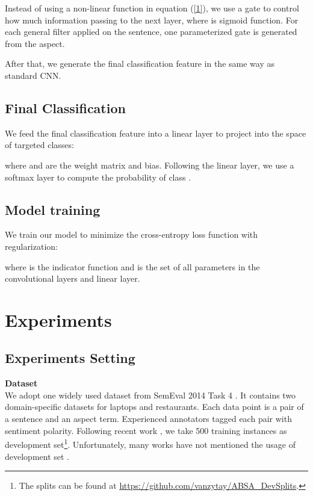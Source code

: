 \documentclass[11pt,a4paper]{article}
\begin{document}
Instead of using a non-linear function  in equation (\ref{1}), we use a gate  to control how much information passing to the next layer, where  is sigmoid function. For each general filter applied on the sentence, one parameterized gate is generated from the aspect.

After that, we generate the final classification feature  in the same way as standard CNN.


\subsection{Final Classification}
We feed the final classification feature into a linear layer to project  into the space of targeted classes:

where  and  are the weight matrix and bias. Following the linear layer, we use a softmax layer to compute the probability of class .


\subsection{Model training}
We train our model to minimize the cross-entropy loss function with  regularization:

where  is the indicator function and  is the set of all parameters in the convolutional layers and linear layer.
 \section{Experiments}
\subsection{Experiments Setting}
\textbf{Dataset}\\
We adopt one widely used dataset from SemEval 2014 Task 4 \cite{pontiki2014semeval}. It contains two domain-specific datasets for laptops and restaurants. Each data point is a pair of a sentence and an aspect term. Experienced annotators tagged each pair with sentiment polarity. Following recent work \cite{tay2017learning}, we take 500 training instances as development set\footnote{The splits can be found at \href{https://github.com/vanzytay/ABSA_DevSplits}{https://github.com/vanzytay/ABSA\_DevSplits}.}. Unfortunately, many works have not mentioned the usage of development set \cite{wang2016attention,ma2017interactive}.
\end{document}
